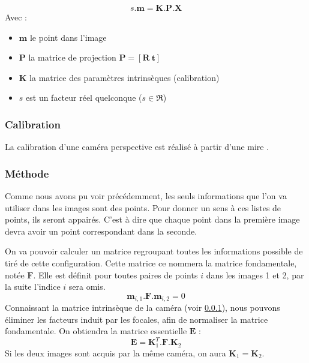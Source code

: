 \begin{equation}
s.\mathbf{m} = \mathbf{K}.\mathbf{P}.\mathbf{X}
\end{equation}
Avec : 
\begin{itemize}
\item $\mathbf{m}$ le point dans l'image
\item $\mathbf{P}$ la matrice de projection 
$\mathbf{P} = [ \mathbf{R} ~ \mathbf{t} ]$
\item $\mathbf{K}$ la matrice des paramètres intrinsèques (calibration)
\item $s$ est un facteur réel quelconque ($s \in \Re$)
\end{itemize}

\subsubsection{Calibration}
\label{subsub:calibration}
La calibration d'une caméra perspective est réalisé à partir d'une mire \cite{??}.

\subsubsection{Méthode}

Comme nous avons pu voir précédemment, les seuls informations que l'on va utiliser dans les images sont des points.
Pour donner un sens à ces listes de points, ils seront appairés.
C'est à dire que chaque point dans la première image devra avoir un point correspondant dans la seconde.

On va pouvoir calculer un matrice regroupant toutes les informations possible de tiré de cette configuration.
Cette matrice ce nommera la matrice fondamentale, notée $\mathbf{F}$.
Elle est définit pour toutes paires de points $i$ dans les images 1 et 2, par la suite l'indice $i$ sera omis.
\begin{equation}
\mathbf{m}_{i,1}.\mathbf{F}.\mathbf{m}_{i,2} = 0
\label{eq:fondamentale}
\end{equation}
Connaissant la matrice intrinsèque de la caméra (voir \ref{subsub:calibration}), nous pouvons éliminer les facteurs induit par les focales, afin de normaliser la matrice fondamentale.
On obtiendra la matrice essentielle $\mathbf{E}$ :
\begin{equation}
\mathbf{E} = \mathbf{K}_1^{T} . \mathbf{F} . \mathbf{K}_2
\end{equation}
Si les deux images sont acquis par la même caméra, on aura $\mathbf{K}_1 = \mathbf{K}_2$.

